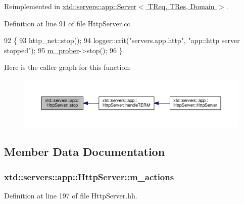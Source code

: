 Reimplemented in \hyperlink{classxtd_1_1servers_1_1app_1_1Server_a37fe0eca660f81a9edde0c1ce6938f39}{xtd\-::servers\-::app\-::\-Server$<$ T\-Req, T\-Res, Domain $>$}.



Definition at line 91 of file Http\-Server.\-cc.


\begin{DoxyCode}
92 \{
93   http\_net::stop();
94   logger::crit(\textcolor{stringliteral}{"servers.app.http"}, \textcolor{stringliteral}{"app::http server stopped"});
95   \hyperlink{classxtd_1_1servers_1_1app_1_1HttpServer_aa26ddc958ab07774e8ba45e89dc0011b}{m\_prober}->stop();
96 \}
\end{DoxyCode}


Here is the caller graph for this function\-:
\nopagebreak
\begin{figure}[H]
\begin{center}
\leavevmode
\includegraphics[width=350pt]{classxtd_1_1servers_1_1app_1_1HttpServer_a7fdba08e0fa4dc9bbec30a989ccf4049_icgraph}
\end{center}
\end{figure}




\subsection{Member Data Documentation}
\hypertarget{classxtd_1_1servers_1_1app_1_1HttpServer_afa5363da18a3aa9de651e53e409116e9}{
\subsubsection[{m\-\_\-actions}]{ xtd\-::servers\-::app\-::\-Http\-Server\-::m\-\_\-actions\hspace{0.3cm}{\ttfamily [protected]}}}\label{classxtd_1_1servers_1_1app_1_1HttpServer_afa5363da18a3aa9de651e53e409116e9}


Definition at line 197 of file Http\-Server.\-hh.

